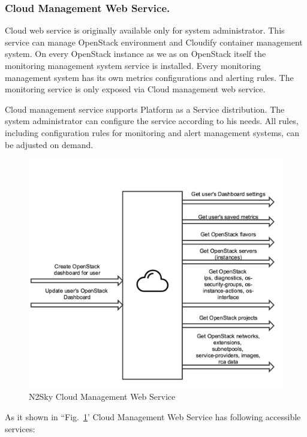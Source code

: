 \subsubsection{Cloud Management Web Service.}\label{Cloud management Web Service}  Cloud web service is originally available only for system administrator. This service can manage OpenStack environment and Cloudify container management system. On every OpenStack instance as we as on OpenStack itself the monitoring management system service is installed. Every monitoring management system has its own metrics configurations and alerting rules. The monitoring service is only exposed via Cloud management web service. 
 
 Cloud management service supports Platform as a Service distribution. The system administrator can configure the service according to his needs. All rules, including configuration rules for monitoring and alert management systems, can be adjusted on demand.  
 
 
\begin{figure}[htbp]
\begin{center}
  \includegraphics[width=\linewidth]{components/3/components/cloud_service.png}
  \caption{N2Sky Cloud Management Web Service}
  \label{fig:cloud_service}
\end{center}
\end{figure}

 
 As it shown in ``Fig.~\ref{fig:cloud_service}' Cloud Management Web Service has following accessible services:

